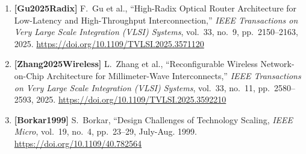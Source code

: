\begin{enumerate}
    \item \textbf{[Gu2025Radix]} F.~Gu et al., ``High-Radix Optical Router Architecture for Low-Latency and High-Throughput Interconnection,'' \emph{IEEE Transactions on Very Large Scale Integration (VLSI) Systems}, vol.~33, no.~9, pp.~2150--2163, 2025. \url{https://doi.org/10.1109/TVLSI.2025.3571120}
    \item \textbf{[Zhang2025Wireless]} L.~Zhang et al., ``Reconfigurable Wireless Network-on-Chip Architecture for Millimeter-Wave Interconnects,'' \emph{IEEE Transactions on Very Large Scale Integration (VLSI) Systems}, vol.~33, no.~11, pp.~2580--2593, 2025. \url{https://doi.org/10.1109/TVLSI.2025.3592210}

    \item \textbf{[Borkar1999]} S.~Borkar, ``Design Challenges of Technology Scaling, \emph{IEEE Micro}, vol.~19, no.~4, pp.~23--29, July-Aug. 1999. \url{https://doi.org/10.1109/40.782564}
\end{enumerate}
